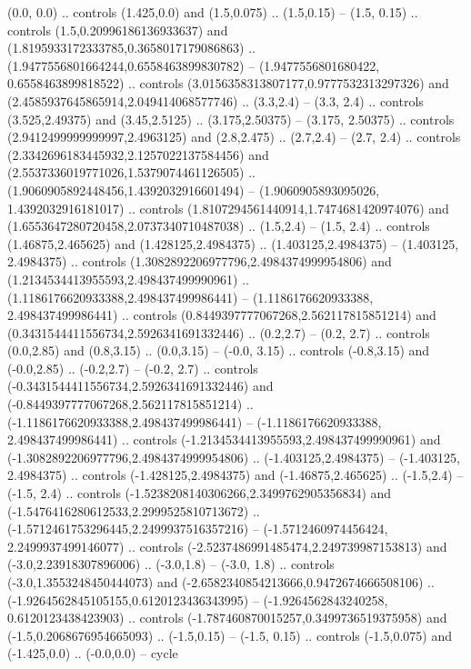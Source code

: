 (0.0, 0.0) .. controls (1.425,0.0) and (1.5,0.075) .. (1.5,0.15) --
(1.5, 0.15) .. controls (1.5,0.20996186136933637) and (1.8195933172333785,0.3658017179086863) .. (1.9477556801664244,0.6558463899830782) --
(1.9477556801680422, 0.6558463899818522) .. controls (3.0156358313807177,0.9777532313297326) and (2.4585937645865914,2.049414068577746) .. (3.3,2.4) --
(3.3, 2.4) .. controls (3.525,2.49375) and (3.45,2.5125) .. (3.175,2.50375) --
(3.175, 2.50375) .. controls (2.9412499999999997,2.4963125) and (2.8,2.475) .. (2.7,2.4) --
(2.7, 2.4) .. controls (2.3342696183445932,2.1257022137584456) and (2.5537336019771026,1.5379074461126505) .. (1.9060905892448456,1.4392032916601494) --
(1.9060905893095026, 1.4392032916181017) .. controls (1.8107294561440914,1.7474681420974076) and (1.6553647280720458,2.0737340710487038) .. (1.5,2.4) --
(1.5, 2.4) .. controls (1.46875,2.465625) and (1.428125,2.4984375) .. (1.403125,2.4984375) --
(1.403125, 2.4984375) .. controls (1.3082892206977796,2.4984374999954806) and (1.2134534413955593,2.498437499990961) .. (1.1186176620933388,2.498437499986441) --
(1.1186176620933388, 2.498437499986441) .. controls (0.8449397777067268,2.562117815851214) and (0.3431544411556734,2.5926341691332446) .. (0.2,2.7) --
(0.2, 2.7) .. controls (0.0,2.85) and (0.8,3.15) .. (0.0,3.15) --
(-0.0, 3.15) .. controls (-0.8,3.15) and (-0.0,2.85) .. (-0.2,2.7) --
(-0.2, 2.7) .. controls (-0.3431544411556734,2.5926341691332446) and (-0.8449397777067268,2.562117815851214) .. (-1.1186176620933388,2.498437499986441) --
(-1.1186176620933388, 2.498437499986441) .. controls (-1.2134534413955593,2.498437499990961) and (-1.3082892206977796,2.4984374999954806) .. (-1.403125,2.4984375) --
(-1.403125, 2.4984375) .. controls (-1.428125,2.4984375) and (-1.46875,2.465625) .. (-1.5,2.4) --
(-1.5, 2.4) .. controls (-1.5238208140306266,2.3499762905356834) and (-1.5476416280612533,2.2999525810713672) .. (-1.5712461753296445,2.2499937516357216) --
(-1.5712460974456424, 2.2499937499146077) .. controls (-2.5237486991485474,2.249739987153813) and (-3.0,2.23918307896006) .. (-3.0,1.8) --
(-3.0, 1.8) .. controls (-3.0,1.3553248450444073) and (-2.6582340854213666,0.9472674666508106) .. (-1.9264562845105155,0.6120123436343995) --
(-1.9264562843240258, 0.6120123438423903) .. controls (-1.787460870015257,0.3499736519375958) and (-1.5,0.2068676954665093) .. (-1.5,0.15) --
(-1.5, 0.15) .. controls (-1.5,0.075) and (-1.425,0.0) .. (-0.0,0.0) --
cycle